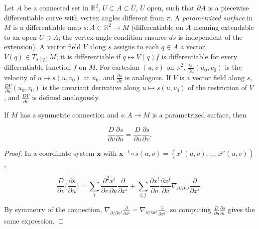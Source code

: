 \begin{definition}
  \label{def:dc-ch3-3-3}
  Let $A$ be a connected set in $\mathbb{R}^2$, $U\subset A\subset\overline{U}$, $U$
  open, such that $\partial A$ is a piecewise differentiable curve with vertex
  angles different from $\pi$. A \emph{parametrized surface} in $M$ is a differentiable
  map $s:A\subset\mathbb{R}^2\to M$ (differentiable on $A$ meaning extendable to an
  open $U\supset A$; the vertex-angle condition ensures $ds$ is independent of the
  extension). A vector field $V$ along $s$ assigns to each $q\in A$ a vector
  $V(q)\in T_{s(q)}M$; it is differentiable if $q\mapsto V(q)f$ is differentiable
  for every differentiable function $f$ on $M$. For cartesian $(u,v)$ on
  $\mathbb{R}^2$, $\frac{\partial s}{\partial u}(u_0,v_0)$ is the velocity of
  $u\mapsto s(u,v_0)$ at $u_0$, and $\frac{\partial s}{\partial v}$ is analogous.
  If $V$ is a vector field along $s$, $\frac{DV}{\partial u}(u_0,v_0)$ is the
  covariant derivative along $u\mapsto s(u,v_0)$ of the restriction of $V$, and
  $\frac{DV}{\partial v}$ is defined analogously.
\end{definition}

\begin{lemma}[symmetry]
  \label{lem:dc-ch3-3-4}
  \leanok
  If $M$ has a symmetric connection and $s:A\to M$ is a parametrized surface, then
  
  $$
  \frac{D}{\partial v}\frac{\partial s}{\partial u}=\frac{D}{\partial u}\frac{\partial s}{\partial v}.
  $$
\end{lemma}
\begin{proof}
  \sketch
  \leanok
  In a coordinate system $\mathbf{x}$ with
  $\mathbf{x}^{-1}\circ s(u,v)=(x^1(u,v),\dots,x^n(u,v))$,
  
  $$
  \frac{D}{\partial v}\Big(\frac{\partial s}{\partial u}\Big)=\sum_i\frac{\partial^2 x^i}{\partial v\,\partial u}\frac{\partial}{\partial x^i}+\sum_{i,j}\frac{\partial x^i}{\partial u}\frac{\partial x^j}{\partial v}\nabla_{\partial/\partial x^j}\frac{\partial}{\partial x^i}.
  $$
  
  By symmetry of the connection,
  $\nabla_{\partial/\partial x^j}\frac{\partial}{\partial x^i}=\nabla_{\partial/\partial x^i}\frac{\partial}{\partial x^j}$,
  so computing $\frac{D}{\partial u}\frac{\partial s}{\partial v}$ gives the same
  expression.
\end{proof}

